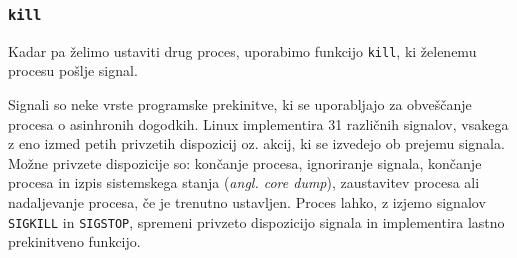 \documentclass[a4paper,12pt,openright]{book}
\begin{document}
\subsubsection{\texttt{kill}}

Kadar pa želimo ustaviti drug proces, uporabimo funkcijo \texttt{kill}, ki želenemu procesu pošlje signal.

Signali so neke vrste programske prekinitve, ki se uporabljajo za obveščanje procesa o asinhronih dogodkih. %
Linux implementira 31 različnih signalov, vsakega z eno izmed petih privzetih dispozicij oz. akcij, ki se izvedejo ob prejemu signala.
Možne privzete dispozicije so: končanje procesa, ignoriranje signala, končanje procesa in izpis sistemskega stanja (\textit{angl. core dump}), zaustavitev procesa ali nadaljevanje procesa, če je trenutno ustavljen.
Proces lahko, z izjemo signalov \texttt{SIGKILL} in \texttt{SIGSTOP}, spremeni privzeto dispozicijo signala in implementira lastno prekinitveno funkcijo.
\end{document}
